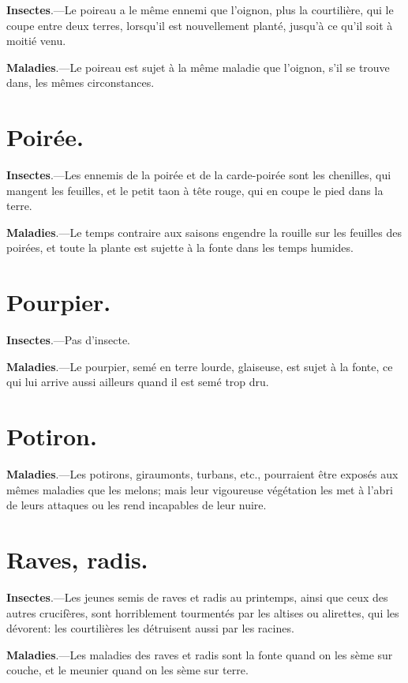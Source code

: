\documentclass[10pt,a4paper]{book}
\begin{document}
\textbf{Insectes}.---Le poireau a le même ennemi que l'oignon, plus la courtilière, qui le coupe entre deux terres, lorsqu'il est nouvellement planté, jusqu'à ce qu'il soit à moitié venu.

\textbf{Maladies}.---Le poireau est sujet à la même maladie que l'oignon, s'il se trouve dans, les mêmes circonstances.

\section{Poirée.}

\textbf{Insectes}.---Les ennemis de la poirée et de la carde-poirée sont les chenilles, qui mangent les feuilles, et le petit taon à tête rouge, qui en coupe le pied dans la terre.

\textbf{Maladies}.---Le temps contraire aux saisons engendre la rouille sur les feuilles des poirées, et toute la plante est sujette à la fonte dans les temps humides.

\section{Pourpier.}

\textbf{Insectes}.---Pas d'insecte.

\textbf{Maladies}.---Le pourpier, semé en terre lourde, glaiseuse, est sujet à la fonte, ce qui lui arrive aussi ailleurs quand il est semé trop dru.

\section{Potiron.}

\textbf{Maladies}.---Les potirons, giraumonts, turbans, etc., pourraient être exposés aux mêmes maladies que les melons; mais leur vigoureuse végétation les met à l'abri de leurs attaques ou les rend incapables de leur nuire.

\section{Raves, radis.}

\textbf{Insectes}.---Les jeunes semis de raves et radis au printemps, ainsi que ceux des autres crucifères, sont horriblement tourmentés par les altises ou alirettes, qui les dévorent: les courtilières les détruisent aussi par les racines.

\textbf{Maladies}.---Les maladies des raves et radis sont la fonte quand on les sème sur couche, et le meunier quand on les sème sur terre.
\end{document}
